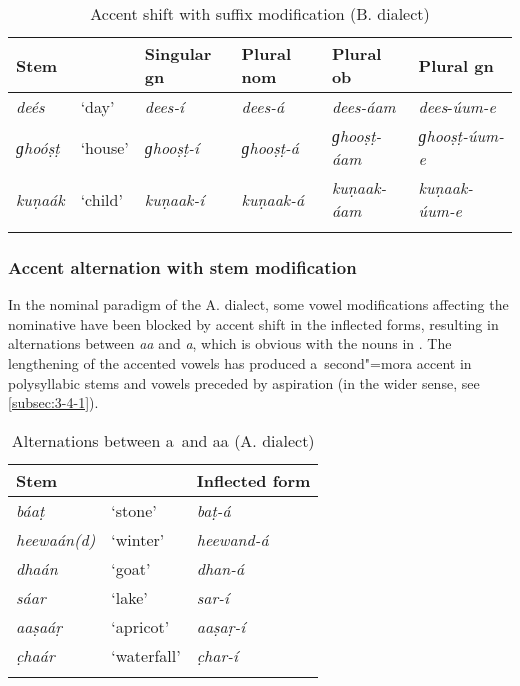 \begin{table}[ht]
\caption{Accent shift with suffix modification (B. dialect)}
\begin{tabularx}{\textwidth}{ Q l l l l l }
\lsptoprule
Stem &
&
Singular gn &
Plural nom &
Plural ob &
Plural gn \\\hline
\textit{deés} &
`day' &
\textit{dees-í} &
\textit{dees-á} &
\textit{dees-áam} &
\textit{dees}-\textit{úum-e}\\
\textit{ɡhoóṣṭ} &
`house' &
\textit{ɡhooṣṭ-í} &
\textit{ɡhooṣṭ-á} &
\textit{ɡhooṣṭ-áam} &
\textit{ɡhooṣṭ-úum-e} \\
\textit{kuṇaák} &
`child' &
\textit{kuṇaak-í} &
\textit{kuṇaak-á} &
\textit{kuṇaak-áam} &
\textit{kuṇaak-úum-e} \\\lspbottomrule
\end{tabularx}
\label{tab:3-12}
\end{table}

\subsubsection*{Accent alternation with stem modification}

In the nominal paradigm of the A. dialect, some vowel modifications affecting the nominative have been blocked by accent shift in the inflected forms, resulting in alternations between \textit{aa} and \textit{a}, which is obvious with the nouns in . The lengthening of the accented vowels has produced a~second"=mora accent in polysyllabic stems and vowels preceded by aspiration (in the wider sense, see \ref{subsec:3-4-1}). 

\begin{table}[ht]
\caption{Alternations between a~and aa (A. dialect)}
\begin{tabularx}{.75\textwidth}{ Q Q Q }
\lsptoprule
Stem &
&
Inflected form\\\hline
\textit{báaṭ} &
`stone' &
\textit{baṭ-á} \\
\textit{heewaán(d)} &
`winter' &
\textit{heewand-á} \\
\textit{dhaán} &
`goat' &
\textit{dhan-á}\\
\textit{sáar} &
`lake' &
\textit{sar-í}\\
\textit{aaṣaáṛ} &
`apricot' &
\textit{aaṣaṛ-í} \\
\textit{c̣haár} &
`waterfall' &
\textit{c̣har-í} \\\lspbottomrule
\end{tabularx}
\label{tab:3-13}
\end{table}


